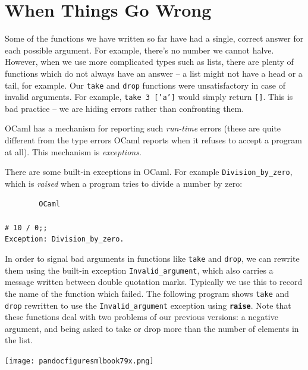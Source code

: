 \documentclass[]{book}
\newcommand{\smspace}{\vspace{4mm}}
\begin{document}
\cleardoublepage
\thispagestyle{empty}


\pagestyle{empty}

\chapter{When Things Go Wrong}
\pagestyle{fancy}

Some of the functions we have written so far have had a single, correct answer for each possible argument. For example, there's no number we cannot halve. However, when we use more complicated types such as lists, there are plenty of functions which do not always have an answer -- a list might not have a head or a tail, for example. Our \texttt{take} and \texttt{drop} functions were unsatisfactory in case of invalid arguments. For example, \texttt{take 3 ['a']} would simply return \texttt{[]}. This is bad practice -- we are hiding errors rather than confronting them.

OCaml has a mechanism for reporting such \textit{run-time} errors (these are quite different from the type errors OCaml reports when it refuses to accept a program at all). This mechanism is \textit{exceptions}.

There are some built-in exceptions in OCaml. For example \texttt{Division\_by\_zero}, which is \textit{raised} when a program tries to divide a number by zero:

\smspace
\noindent\verb!        OCaml!\\
\noindent\\
\noindent\verb!# 10 / 0;;!\\
\noindent\verb!Exception: Division_by_zero.!
\smspace

\noindent In order to signal bad arguments in functions like \texttt{take} and \texttt{drop}, we can rewrite them using the built-in exception \texttt{Invalid\_argument}, which also carries a message written between double quotation marks. Typically we use this to record the name of the function which failed. The following program shows \texttt{take} and \texttt{drop} rewritten to use the \texttt{Invalid\_argument} exception using \texttt{\textbf{raise}}. Note that these functions deal with two problems of our previous versions: a negative argument, and being asked to take or drop more than the number of elements in the list.


\medskip
\begin{center}
\noindent\texttt{[image: pandocfiguresmlbook79x.png]}
\end{center}
\medskip
\end{document}
